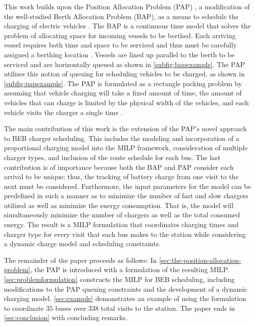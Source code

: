 \documentclass[utf8]{FrontiersinHarvard}
\let\cite\citep                                       %
\newcommand{\A}{35 }                                                            %
\newcommand{\N}{338 }                                                           %
\begin{document}
This work builds upon the Position Allocation Problem (PAP) \cite{qarebagh-2019-optim-sched}, a modification of the
well-studied Berth Allocation Problem (BAP), as a means to schedule the charging of electric vehicles
\cite{buhrkal-2011-model-discr,frojan-2015-contin-berth,imai-2001-dynam-berth}. The BAP is a continuous time model
that solves the problem of allocating space for incoming vessels to be berthed. Each arriving vessel requires both time
and space to be serviced and thus must be carefully assigned a berthing location \cite{imai-2001-dynam-berth}. Vessels
are lined up parallel to the berth to be serviced and are horizontally queued as shown in \autoref{subfig:bapexample}.
The PAP utilizes this notion of queuing for scheduling vehicles to be charged, as shown in \autoref{subfig:papexample}.
The PAP is formulated as a rectangle packing problem by assuming that vehicle charging will take a fixed amount of time,
the amount of vehicles that can charge is limited by the physical width of the vehicles, and each vehicle visits the
charger a single time \cite{qarebagh-2019-optim-sched}.

The main contribution of this work is the extension of the PAP's novel approach to BEB charger scheduling. This includes
the modeling and incorporation of a proportional charging model into the MILP framework, consideration of multiple
charger types, and inclusion of the route schedule for each bus. The last contribution is of importance because both the
BAP and PAP consider each arrival to be unique; thus, the tracking of battery charge from one visit to the next must be
considered. Furthermore, the input parameters for the model can be predefined in such a manner as to minimize the number
of fast and slow chargers utilized as well as minimize the energy consumption. That is, the model will simultaneously
minimize the number of chargers as well as the total consumed energy. The result is a MILP formulation that coordinates
charging times and charger type for every visit that each bus makes to the station while considering a dynamic charge
model and scheduling constraints.

The remainder of the paper proceeds as follows: In \autoref{sec:the-position-allocation-problem}, the PAP is introduced
with a formulation of the resulting MILP. \autoref{sec:problemformulation} constructs the MILP for BEB scheduling,
including modifications to the PAP queuing constraints and the development of a dynamic charging model.
\autoref{sec:example} demonstrates an example of using the formulation to coordinate \A buses over \N total visits to
the station. The paper ends in \autoref{sec:conclusion} with concluding remarks.
\end{document}

